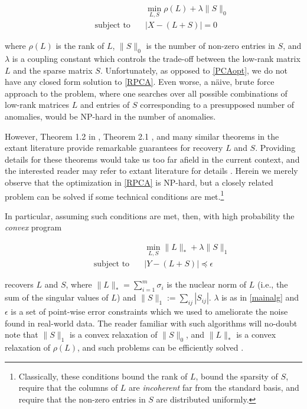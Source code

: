 \documentclass[conference]{IEEEtran}
\begin{document}
\begin{align} \label{RPCA}
  &\min_{L,S}\rho(L)+\lambda\|S\|_{0}\\ \nonumber
  \qquad \text{subject to} \quad &
                                   |X-(L+S)| = 0
\end{align}

\noindent where $\rho(L)$ is the rank of $L$, $\|S\|_{0}$ is the
number of non-zero entries in $S$, and $\lambda$ is a coupling
constant which controls the trade-off between the low-rank matrix $L$
and the sparse matrix $S$.  Unfortunately, as opposed to
\eqref{PCAopt}, we do not have any closed form solution to
\eqref{RPCA}.   Even worse, a n\"{a}ive, brute force
approach to the problem, where one searches over all possible
combinations of low-rank matrices $L$ and entries of $S$ corresponding
to a presupposed number of anomalies, would be NP-hard in the number
of anomalies.

However, Theorem 1.2 in \cite{Candes2011}, Theorem 2.1
\cite{Paffenroth2012a}, and many similar theorems in the extant
literature provide remarkable guarantees for recovery $L$ and $S$.
Providing details for these theorems would take us too far afield in
the current context, and the interested reader may refer to extant
literature for details \cite{Candes2009, candes09ex, Chandrasekaran2009,
  Candes2011, Paffenroth2012a, Paffenroth2013b}.
Herein we merely observe that the optimization in \eqref{RPCA} is
NP-hard, but a closely related problem can be solved if some technical
conditions are met.\footnote{Classically, these conditions bound the
  rank of $L$, bound the sparsity of $S$, require that the columns of
  $L$ are \textit{incoherent} far from the standard basis, and require
  that the non-zero entries in $S$ are distributed uniformly.}

In particular, assuming such conditions are met, then, with high
probability the \emph{convex} program

\begin{align} \label{mainalg}
  &\min_{L,S}\|L\|_{*}+\lambda\|S\|_{1}\\ \nonumber
  \qquad \text{subject to} \quad &
                                   |Y-(L+S)|
                                   \preceq \epsilon
\end{align}

\noindent recovers $L$ and $S$, where
$\|L\|_{*} = \sum_{i=1}^m\sigma_{i}$ is the nuclear norm of $L$ (i.e.,
the sum of the singular values of $L$) and
$\|S\|_1:= \sum_{ij}|S_{ij}|$.  $\lambda$ is as in \eqref{mainalg} and
$\epsilon$ is a set of point-wise error constraints which we used to
ameliorate the noise found in real-world data.  The reader familiar
with such algorithms will no-doubt note that $\|S\|_1$ is a convex
relaxation of $\|S\|_0$, and $\|L\|_*$ is a convex relaxation of
$\rho(L)$, and such problems can be efficiently solved
\cite{Boyd2010a, Candes2009, Candes2011, Paffenroth2012a,
  Paffenroth2013b, Halko2011}.
\end{document}
